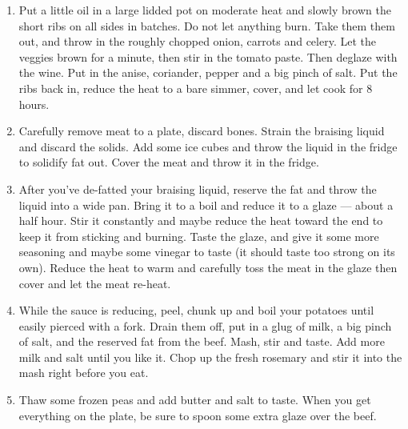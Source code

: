 \documentclass[]{report}
\begin{document}
            {\begin{enumerate}    %
                  \item  Put a little oil in a large lidded pot on moderate heat and slowly brown the short ribs on all sides in batches. Do not let anything burn. Take them them out, and throw in the roughly chopped onion, carrots and celery. Let the veggies brown for a minute, then stir in the tomato paste. Then deglaze with the wine. Put in the anise, coriander, pepper and a big pinch of salt. Put the ribs back in, reduce the heat to a bare simmer, cover, and let cook for 8 hours.
                  \item Carefully remove meat to a plate, discard bones. Strain the braising liquid and discard the solids. Add some ice cubes and throw the liquid in the fridge to solidify fat out. Cover the meat and throw it in the fridge.
                  \item After you've de-fatted your braising liquid, reserve the fat and throw the liquid into a wide pan. Bring it to a boil and reduce it to a glaze — about a half hour. Stir it constantly and maybe reduce the heat toward the end to keep it from sticking and burning. Taste the glaze, and give it some more seasoning and maybe some vinegar to taste (it should taste too strong on its own). Reduce the heat to warm and carefully toss the meat in the glaze then cover and let the meat re-heat. 
                  \item While the sauce is reducing, peel, chunk up and boil your potatoes until easily pierced with a fork. Drain them off, put in a glug of milk, a big pinch of salt, and the reserved fat from the beef. Mash, stir and taste. Add more milk and salt until you like it. Chop up the fresh rosemary and stir it into the mash right before you eat.
                  \item Thaw some frozen peas and add butter and salt to taste. When you get everything on the plate, be sure to spoon some extra glaze over the beef.
            \end{enumerate}}
\end{document}
